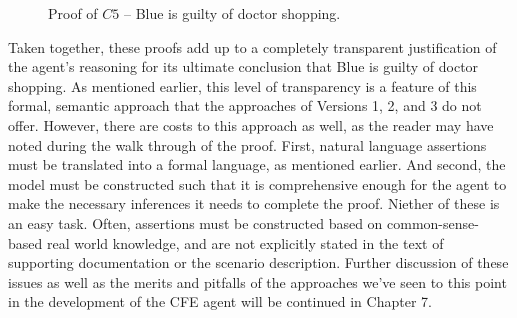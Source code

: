 \begin{figure}[h!] 
\vspace{6pt}
\centering
{}
\caption{Proof of $C5$ -- Blue is guilty of doctor shopping.}
\label{fig:proof_of_c5}
\end{figure}

Taken together, these proofs add up to a completely transparent justification of the agent's reasoning for its ultimate conclusion that Blue is guilty of doctor shopping.  As mentioned earlier, this level of transparency is a feature of this formal, semantic approach that the approaches of Versions 1, 2, and 3 do not offer.  However, there are costs to this approach as well, as the reader may have noted during the walk through of the proof.  First, natural language assertions must be translated into a formal language, as mentioned earlier.  And second, the model must be constructed such that it is comprehensive enough for the agent to make the necessary inferences it needs to complete the proof.  Niether of these is an easy task.  Often, assertions must be constructed based on common-sense-based real world knowledge, and are not explicitly stated in the text of supporting documentation or the scenario description.  Further discussion of these issues as well as the merits and pitfalls of the approaches we've seen to this point in the development of the CFE agent will be continued in Chapter 7.



